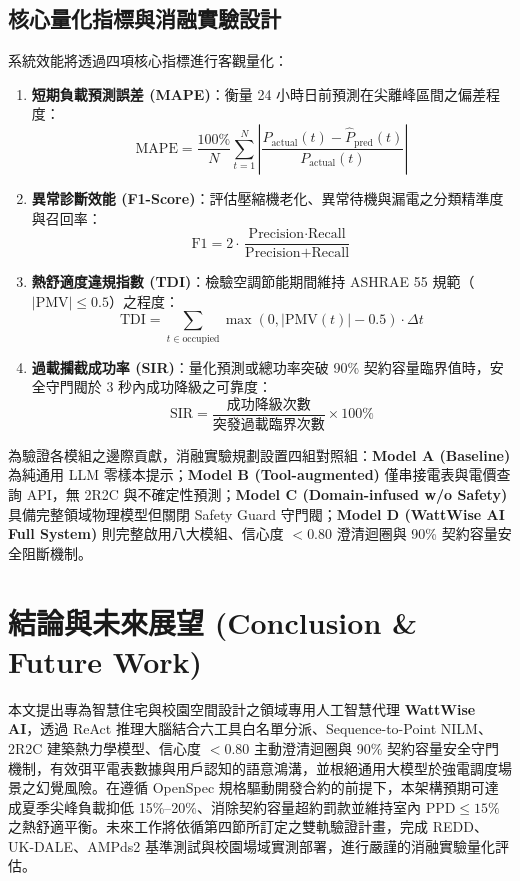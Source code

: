 \documentclass[conference]{IEEEtran}
\begin{document}
\subsection{核心量化指標與消融實驗設計}
系統效能將透過四項核心指標進行客觀量化：
\begin{enumerate}
    \item \textbf{短期負載預測誤差 (MAPE)}：衡量 24 小時日前預測在尖離峰區間之偏差程度：
    \begin{equation}
        \text{MAPE} = \frac{100\%}{N}\sum_{t=1}^{N}\left|\frac{P_{\text{actual}}(t) - \hat{P}_{\text{pred}}(t)}{P_{\text{actual}}(t)}\right|
    \end{equation}
    \item \textbf{異常診斷效能 (F1-Score)}：評估壓縮機老化、異常待機與漏電之分類精準度與召回率：
    \begin{equation}
        \text{F1} = 2 \cdot \frac{\text{Precision} \cdot \text{Recall}}{\text{Precision} + \text{Recall}}
    \end{equation}
    \item \textbf{熱舒適度違規指數 (TDI)}：檢驗空調節能期間維持 ASHRAE 55 規範（$|\text{PMV}| \le 0.5$）之程度：
    \begin{equation}
        \text{TDI} = \sum_{t \in \text{occupied}} \max(0, |\text{PMV}(t)| - 0.5) \cdot \Delta t
    \end{equation}
    \item \textbf{過載攔截成功率 (SIR)}：量化預測或總功率突破 90\% 契約容量臨界值時，安全守門閥於 3 秒內成功降級之可靠度：
    \begin{equation}
        \text{SIR} = \frac{\text{成功降級次數}}{\text{突發過載臨界次數}} \times 100\%
    \end{equation}
\end{enumerate}

為驗證各模組之邊際貢獻，消融實驗規劃設置四組對照組：\textbf{Model A (Baseline)} 為純通用 LLM 零樣本提示；\textbf{Model B (Tool-augmented)} 僅串接電表與電價查詢 API，無 2R2C 與不確定性預測；\textbf{Model C (Domain-infused w/o Safety)} 具備完整領域物理模型但關閉 Safety Guard 守門閥；\textbf{Model D (WattWise AI Full System)} 則完整啟用八大模組、信心度 $< 0.80$ 澄清迴圈與 90\% 契約容量安全阻斷機制。

\section{結論與未來展望 (Conclusion \& Future Work)}

本文提出專為智慧住宅與校園空間設計之領域專用人工智慧代理 \textbf{WattWise AI}，透過 ReAct 推理大腦結合六工具白名單分派、Sequence-to-Point NILM、2R2C 建築熱力學模型、信心度 $< 0.80$ 主動澄清迴圈與 90\% 契約容量安全守門機制，有效弭平電表數據與用戶認知的語意鴻溝，並根絕通用大模型於強電調度場景之幻覺風險。在遵循 OpenSpec 規格驅動開發合約的前提下，本架構預期可達成夏季尖峰負載抑低 15\%--20\%、消除契約容量超約罰款並維持室內 $\text{PPD} \le 15\%$ 之熱舒適平衡。未來工作將依循第四節所訂定之雙軌驗證計畫，完成 REDD、UK-DALE、AMPds2 基準測試與校園場域實測部署，進行嚴謹的消融實驗量化評估。
\end{document}
